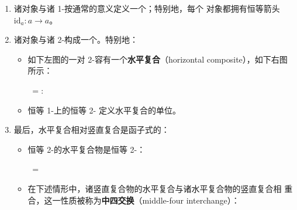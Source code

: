 \begin{definition}[2-\trCategory]
\begin{enumerate}[label=(\roman*)]
\begin{itemize}
\begin{center}
    $\;=:\;$
    \end{center}
  \item 每支 1-\trCell{} $f\colon a\to b$ 都拥有一个恒等 2-\trCell{}
    。
  \end{itemize}
\item 诸对象与诸 1-\trCell{}按通常的意义定义一个\trCategory；特别地，每个
  对象都拥有恒等箭头 $\mathrm{id}_{a}\colon a\to a$。
\item 诸对象与诸 2-\trCell{}构成一个\trCategory。特别地：
  \begin{itemize}
  \item 如下左图的一对 2-\trCell{}容有一个\textbf{水平复合}（horizontal
    composite），如下右图所示：
    \begin{center}
    $\;=:\;$
    \end{center}
  \item 恒等 1-\trCell{}上的恒等 2-\trCell{}
    定义水平复合的单位。
  \end{itemize}
\item 最后，水平复合相对竖直复合是函子式的：
  \begin{itemize}
  \item 恒等 2-\trCell{}的水平复合物是恒等 2-\trCell{}：
    \begin{center}
    $\;=\;$%
    \end{center}
  \item 在下述情形中，诸竖直复合物的水平复合与诸水平复合物的竖直复合相
    重合，这一性质被称为\textbf{中四交换}（middle-four interchange）：
    \begin{center}
\end{center}
\end{itemize}
\end{enumerate}
\end{definition}
